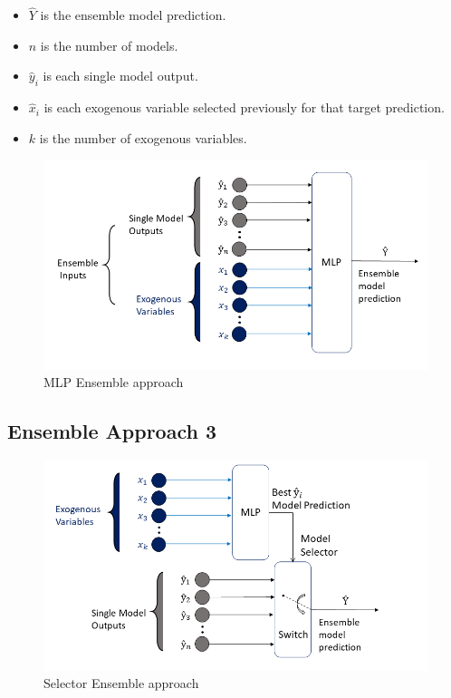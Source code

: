 \begin{itemize}
    \item \begin{math}\hat{Y}\end{math} is the ensemble model prediction.
    \item \begin{math}n\end{math} is the number of models.
    \item \begin{math}\hat{y}_i\end{math} is each single model output.
    \item \begin{math}\hat{x}_i\end{math} is each exogenous variable selected previously for that target prediction.
    \item \begin{math}k\end{math} is the number of exogenous variables.
\end{itemize}

\begin{figure}[h]
\centering
\includegraphics[width=\linewidth]{figures/Ch4/Ensemble_Approach2.png}
\caption{MLP Ensemble approach}
\label{f:Ensemble-approach2}
\end{figure}

\subsection{Ensemble Approach 3}
\label{s:Ensemble-Approach3}

\begin{figure}[h]
\centering
\includegraphics[width=\linewidth]{figures/Ch4/Ensemble_Approach3.png}
\caption{Selector Ensemble approach}
\label{f:Ensemble-approach3}
\end{figure}
